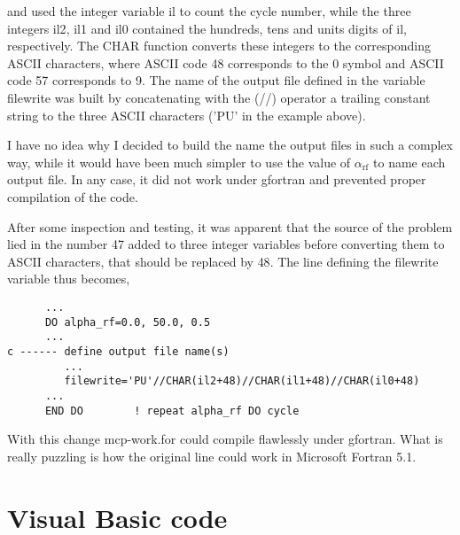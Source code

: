 and used the integer variable \textsf{il} to count the cycle number, while the three integers \textsf{il2}, \textsf{il1} and \textsf{il0} contained the hundreds, tens and units digits of \textsf{il}, respectively. 
The \textsf{CHAR} function converts these integers to the corresponding \textsf{ASCII} characters, where \textsf{ASCII} code 48 corresponds to the \textsf{0} symbol and \textsf{ASCII} code 57 corresponds to \textsf{9}.
The name of the output file defined in the variable \textsf{filewrite} was built by concatenating with the \textsf(//) operator a trailing constant string to the three \textsf{ASCII} characters (\textsf{'PU'} in the example above).

I have no idea why I decided to build the name the output files in such a complex way, while it would have been much simpler to use the value of $\alpha_\mathrm{rf}$ to name each output file.
In any case, it did not work under gfortran and prevented proper compilation of the code. 

After some inspection and testing, it was apparent that the source of the problem lied in the number \textsf{47} added to three integer variables before converting them to \textsf{ASCII} characters, that should be replaced by \textsf{48}. 
The line defining the \textsf{filewrite} variable thus becomes, %

\begin{lstlisting}
      ...
      DO alpha_rf=0.0, 50.0, 0.5
      ...
c ------ define output file name(s)
         ...
         filewrite='PU'//CHAR(il2+48)//CHAR(il1+48)//CHAR(il0+48)
      ...
      END DO        ! repeat alpha_rf DO cycle
\end{lstlisting}

With this change \textsf{mcp-work.for} could compile flawlessly under gfortran.
What is really puzzling is how the original line could work in Microsoft Fortran 5.1.



\section{Visual Basic code}
\label{visual-basic-code}

